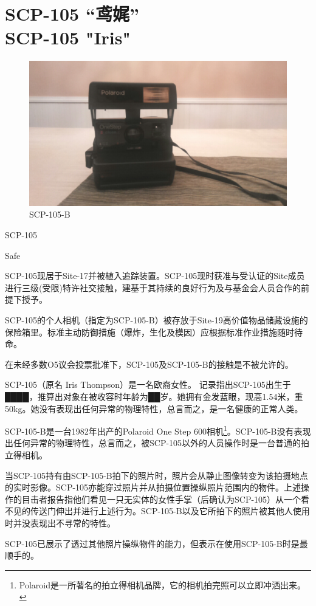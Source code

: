 \chapter[SCP-105 “鸢娓”]{
    SCP-105 “鸢娓”\\
    SCP-105 "Iris"
}

\label{chap:SCP-105}

\begin{figure}[H]
    \centering
    \includegraphics[width=0.5\linewidth]{images/SCP.105.jpg}
    \caption*{SCP-105-B}
\end{figure}

SCP-105

Safe

SCP-105现居于Site-17并被植入追踪装置。SCP-105现时获准与受认证的Site成员进行三级(受限)特许社交接触，建基于其持续的良好行为及与基金会人员合作的前提下授予。

SCP-105的个人相机（指定为SCP-105-B）被存放于Site-19高价值物品储藏设施的保险箱里。标准主动防御措施（爆炸，生化及模因）应根据标准作业措施随时待命。

在未经多数O5议会投票批准下，SCP-105及SCP-105-B的接触是不被允许的。

SCP-105（原名 Iris Thompson）是一名欧裔女性。 记录指出SCP-105出生于████，推算出对象在被收容时年龄为██岁。她拥有金发蓝眼，现高1.54米，重50kg。她没有表现出任何异常的物理特性，总言而之，是一名健康的正常人类。

SCP-105-B是一台1982年出产的Polaroid One Step 600相机\footnote{Polaroid是一所著名的拍立得相机品牌，它的相机拍完照可以立即冲洒出来。}。SCP-105-B没有表现出任何异常的物理特性，总言而之，被SCP-105以外的人员操作时是一台普通的拍立得相机。

当SCP-105持有由SCP-105-B拍下的照片时，照片会从静止图像转变为该拍摄地点的实时影像。SCP-105亦能穿过照片并从拍摄位置操纵照片范围内的物件。上述操作的目击者报告指他们看见一只无实体的女性手掌（后确认为SCP-105）从一个看不见的传送门伸出并进行上述行为。SCP-105-B以及它所拍下的照片被其他人使用时并没表现出不寻常的特性。

SCP-105已展示了透过其他照片操纵物件的能力，但表示在使用SCP-105-B时是最顺手的。

